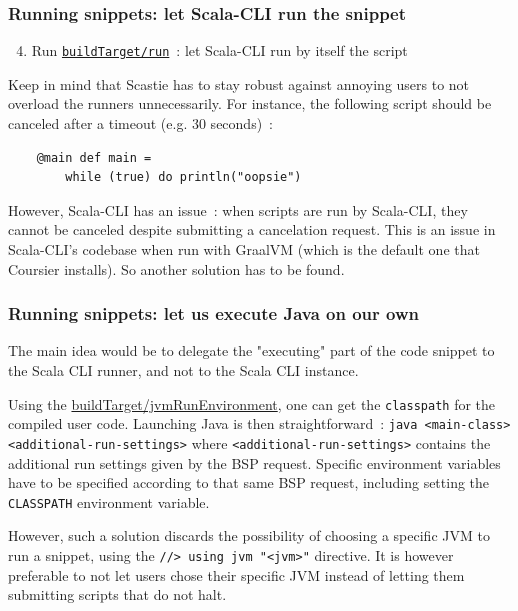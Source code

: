 \documentclass{article}
\begin{document}
\subsubsection{Running snippets: let Scala-CLI run the snippet}

\begin{enumerate}
    \setcounter{enumi}{3}
    \item Run \href{https://build-server-protocol.github.io/docs/specification#compile-request}{\lstinline{buildTarget/run}}~: let Scala-CLI run by itself the script
\end{enumerate}

Keep in mind that Scastie has to stay robust against annoying users to not overload the runners unnecessarily. For instance, the following script should be canceled after a timeout (e.g. 30 seconds)~:

\begin{lstlisting}
    @main def main =
        while (true) do println("oopsie")
\end{lstlisting}

However, Scala-CLI has an issue~: when scripts are run by Scala-CLI, they cannot be canceled despite submitting a cancelation request. This is an issue in Scala-CLI's codebase when run with GraalVM (which is the default one that Coursier installs). So another solution has to be found.

\subsubsection{Running snippets: let us execute Java on our own}

The main idea would be to delegate the "executing" part of the code snippet to the Scala CLI runner, and not to the Scala CLI instance.

Using the \href{https://build-server-protocol.github.io/docs/extensions/jvm#run-environment-request}{buildTarget/jvmRunEnvironment}, one can get the \lstinline{classpath} for the compiled user code. Launching Java is then straightforward~: \lstinline{java <main-class> <additional-run-settings>} where \lstinline{<additional-run-settings>} contains the additional run settings given by the BSP request. Specific environment variables have to be specified according to that same BSP request, including setting the \lstinline{CLASSPATH} environment variable.

However, such a solution discards the possibility of choosing a specific JVM to run a snippet, using the \lstinline{//> using jvm "<jvm>"} directive. It is however preferable to not let users chose their specific JVM instead of letting them submitting scripts that do not halt.
\end{document}
